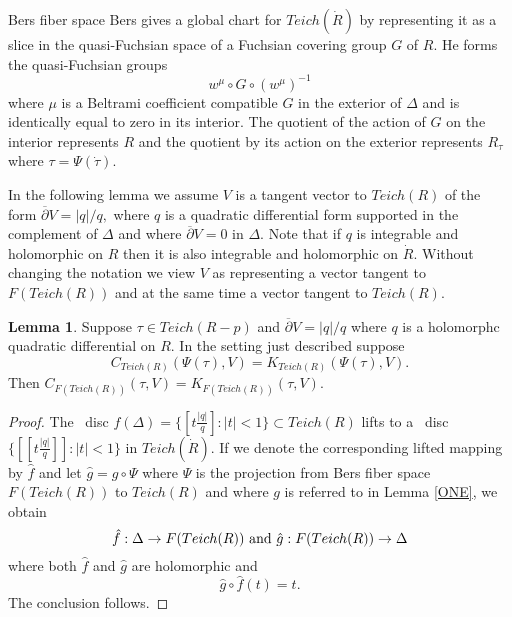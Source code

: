 \documentclass[12pt]{amsart}
\newcommand{\D}{\Delta}
\theoremstyle{remark}
\theoremstyle{definition}
\theoremstyle{definition}
\newtheorem{lemma}{Lemma}
\begin{document}
\begin{section}{Bers fiber space}
        Bers gives a global chart for $Teich(\dot{R})$ by representing it as a slice in the quasi-Fuchsian 
        space of a Fuchsian covering group $G$ of $R.$       He forms the 
        quasi-Fuchsian groups $$w^{\mu} \circ G \circ (w^{\mu})^{-1}$$ 
        where $\mu$ is a Beltrami coefficient compatible $G$ in the exterior of $\Delta$ and is identically equal to zero in its interior.
        The quotient of the action of $G$ on the interior represents $R$ and the quotient by its action on the exterior represents $R_{\tau}$ where $\tau= \Psi(\dot{\tau}).$         
                       
                     In the following lemma we assume $V$ is a tangent vector to $Teich(R)$ of the form 
           $\overline{\partial} V = |q|/q,$ where $q$ is a quadratic differential form supported in the complement of $\Delta$ and where $\overline{\partial} V = 0$ in  $\Delta.$  Note that if $q$ is integrable and holomorphic on $R$ then it is also integrable and holomorphic on $\dot{R}.$  Without changing the notation we  view $V$ as  representing a vector tangent to $F(Teich(R))$ and at the same time a vector tangent to $Teich(R).$
           \begin{lemma}\label{lemma2} Suppose $\tau \in Teich(R-p)$ and 
 $\overline{\partial}V =|q|/q$ where $q$ is a holomorphc quadratic differential on $R.$ In the setting just described suppose $$C_{Teich(R)}(\Psi(\tau),V)=K_{Teich(R)}(\Psi(\tau),V).$$
           Then $C_{F(Teich(R))}(\tau,V)=K_{F(Teich(R))}(\tau,V).$
           \end{lemma}
\begin{proof} The \te\ disc $f(\Delta) =\{[t \frac{|q|}{q}]: |t|<1\} \subset Teich(R)$
lifts to a \te\ disc $\{[[t \frac{|q|}{q}]]: |t|<1\}$ in $Teich(\dot{R}). $  If we denote the corresponding lifted mapping by $\hat{f}$ and let $\hat{g}= g \circ \Psi$ 
where $\Psi$ is the projection from 
Bers fiber space $F(Teich(R))$ to  $Teich(R)$ and where $g$ is  referred to in Lemma \ref{ONE},
we obtain
$$\hat{f}: \D \rightarrow F(Teich(R)) {\rm \ and \ }  \hat{g}: F(Teich(R)) \rightarrow \D$$  where both $\hat{f}$ and $\hat{g}$ are
holomorphic  and \begin{equation}\label{hats} \hat{g} \circ \hat{f}(t) =t.\end{equation}
The conclusion follows.
\end{proof}



  \end{section}
  
\end{document}
